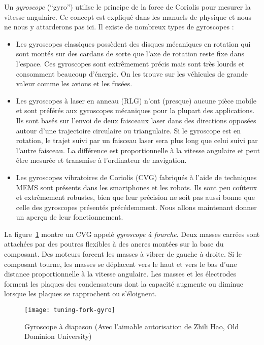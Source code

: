 Un \emph{gyroscope} (``gyro'') utilise le principe de la force de Coriolis pour mesurer la vitesse angulaire. Ce concept est expliqué dans les manuels de physique et nous ne nous y attarderons pas ici. Il existe de nombreux types de gyroscopes :
\begin{itemize}
\item Les gyroscopes classiques possèdent des disques mécaniques en rotation qui sont montés sur des cardans de sorte que l'axe de rotation reste fixe dans l'espace. Ces gyroscopes sont extrêmement précis mais sont très lourds et consomment beaucoup d'énergie. On les trouve sur les véhicules de grande valeur comme les avions et les fusées.
\item Les gyroscopes à laser en anneau (RLG) n'ont (presque) aucune pièce mobile et sont préférés aux gyroscopes mécaniques pour la plupart des applications. Ils sont basés sur l'envoi de deux faisceaux laser dans des directions opposées autour d'une trajectoire circulaire ou triangulaire. Si le gyroscope est en rotation, le trajet suivi par un faisceau laser sera plus long que celui suivi par l'autre faisceau. La différence est proportionnelle à la vitesse angulaire et peut être mesurée et transmise à l'ordinateur de navigation.
\item Les gyroscopes vibratoires de Coriolis (CVG) fabriqués à l'aide de techniques MEMS sont présents dans les smartphones et les robots. Ils sont peu coûteux et extrêmement robustes, bien que leur précision ne soit pas aussi bonne que celle des gyroscopes présentés précédemment. Nous allons maintenant donner un aperçu de leur fonctionnement.
\end{itemize}

La figure~\ref{fig.tuning-gyro-image} montre un CVG appelé \emph{gyroscope à fourche}. Deux masses carrées sont attachées par des poutres flexibles à des ancres montées sur la base du composant. Des moteurs forcent les masses à vibrer de gauche à droite. Si le composant tourne, les masses se déplacent vers le haut et vers le bas d'une distance proportionnelle à la vitesse angulaire. Les masses et les électrodes forment les plaques des condensateurs dont la capacité augmente ou diminue lorsque les plaques se rapprochent ou s'éloignent.

\begin{figure}
\begin{center}
\texttt{[image: tuning-fork-gyro]}
\end{center}
\caption{Gyroscope à diapason (Avec l'aimable autorisation de Zhili Hao, Old Dominion University)}\label{fig.tuning-gyro-image}
\end{figure}

